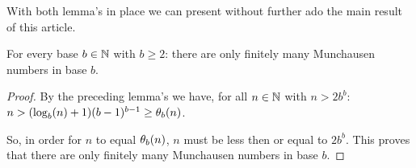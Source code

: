 With both lemma's in place we can present without further ado the main result of
this article.

\begin{proposition}
	For every base $b \in \N$ with $b \ge 2$: there are only finitely many 
	Munchausen numbers in base $b$.
\end{proposition}

\begin{proof}
	By the preceding lemma's we have, for all $n \in \N$ with $n > 2b^{b}$: 
	$n > (\blog(n) + 1)(b-1)^{b-1} \ge \P_{b}(n)$.
	
	So, in order for $n$ to equal $\P_{b}(n)$, $n$ must be less then or equal to 
	$2b^{b}$. This proves that there are only finitely many Munchausen numbers
	in base $b$.
\end{proof}

